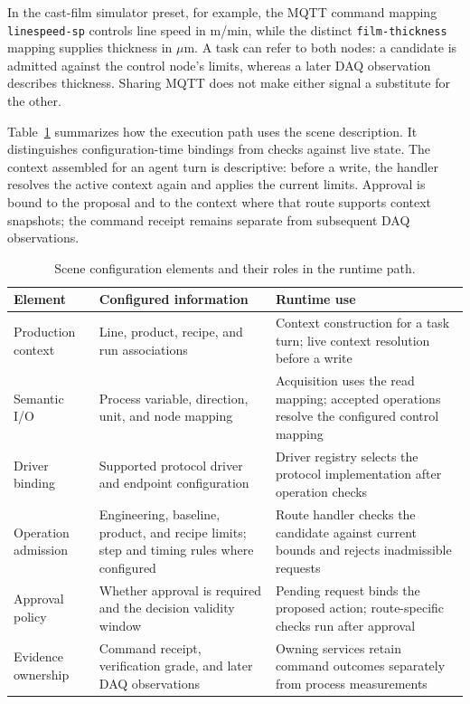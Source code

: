 In the cast-film simulator preset, for example, the MQTT command mapping
\texttt{linespeed-sp} controls line speed in m/min, while the distinct
\texttt{film-thickness} mapping supplies thickness in $\mu$m. A task can
refer to both nodes: a candidate is admitted against the control node's
limits, whereas a later DAQ observation describes thickness. Sharing MQTT does
not make either signal a substitute for the other.

Table~\ref{tab:scene-config} summarizes how the execution path uses the scene
description. It distinguishes configuration-time bindings from
checks against live state. The context assembled for an agent turn is
descriptive: before a write, the handler resolves the active context again
and applies the current limits. Approval is bound to the proposal and to the
context where that route supports context snapshots; the command receipt
remains separate from subsequent DAQ observations.

\begin{table}[!t]
\centering
\caption{Scene configuration elements and their roles in the runtime path.}
\label{tab:scene-config}
\footnotesize
\setlength{\tabcolsep}{5pt}
\begin{tabularx}{\textwidth}{@{}>{\raggedright\arraybackslash}p{}>{\raggedright\arraybackslash}p{}X@{}}
\toprule
Element & Configured information & Runtime use\\
\midrule
Production context & Line, product, recipe, and run associations & Context construction for a task turn; live context resolution before a write\\
Semantic I/O & Process variable, direction, unit, and node mapping & Acquisition uses the read mapping; accepted operations resolve the configured control mapping\\
Driver binding & Supported protocol driver and endpoint configuration & Driver registry selects the protocol implementation after operation checks\\
Operation admission & Engineering, baseline, product, and recipe limits; step and timing rules where configured & Route handler checks the candidate against current bounds and rejects inadmissible requests\\
Approval policy & Whether approval is required and the decision validity window & Pending request binds the proposed action; route-specific checks run after approval\\
Evidence ownership & Command receipt, verification grade, and later DAQ observations & Owning services retain command outcomes separately from process measurements\\
\bottomrule
\end{tabularx}
\end{table}

